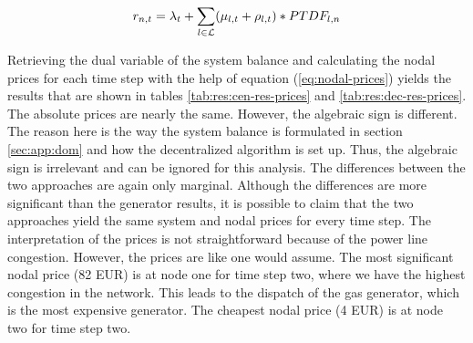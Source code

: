 \begin{equation}
	r_{n,t} = \lambda_t + \sum_{l \in \mathcal{L}} (\mu_{l,t} + \rho_{l,t}) * PTDF_{l,n}
	\label{eq:nodal-prices}
\end{equation}

Retrieving the dual variable of the system balance and calculating the nodal prices for each time step with the help of equation (\ref{eq:nodal-prices}) yields the results that are shown in tables \ref{tab:res:cen-res-prices} and \ref{tab:res:dec-res-prices}. The absolute prices are nearly the same. However, the algebraic sign is different. The reason here is the way the system balance is formulated in section \ref{sec:app:dom} and how the decentralized algorithm is set up. Thus, the algebraic sign is irrelevant and can be ignored for this analysis. The differences between the two approaches are again only marginal. Although the differences are more significant than the generator results, it is possible to claim that the two approaches yield the same system and nodal prices for every time step. The interpretation of the prices is not straightforward because of the power line congestion. However, the prices are like one would assume. The most significant nodal price (82 EUR) is at node one for time step two, where we have the highest congestion in the network. This leads to the dispatch of the gas generator, which is the most expensive generator. The cheapest nodal price (4 EUR) is at node two for time step two.

